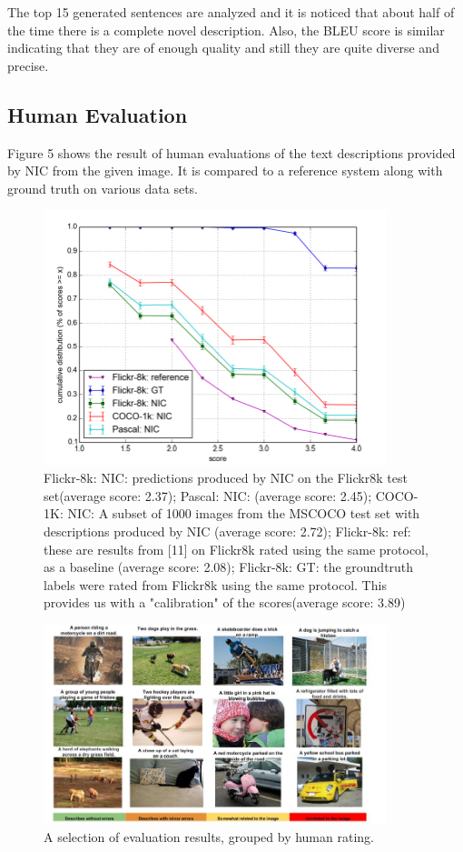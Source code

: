 \documentclass[a4paper,UKenglish,cleveref, autoref, thm-restate]{lipics-v2021}
\begin{document}
The top 15 generated sentences are analyzed and it is noticed that about half of the time there is a complete novel description. Also, the BLEU score is similar indicating that they are of enough quality and still they are quite diverse and precise.

\subsection{Human Evaluation}
Figure 5 shows the result of human evaluations of the text descriptions provided by NIC from the given image. It is compared to a reference system along with ground truth on various data sets.
\begin{figure}[ht]
    \centering
    \includegraphics[width=10cm]{images/NIC_Predictions.png}
    \caption{Flickr-8k: NIC: predictions produced by NIC on the Flickr8k test set(average score: 2.37); Pascal: NIC: (average score: 2.45); COCO-1K: NIC: A subset of 1000 images from the MSCOCO test set with descriptions produced by NIC (average score: 2.72); Flickr-8k: ref: these are results from [11] on Flickr8k rated using the same protocol, as a baseline (average score: 2.08); Flickr-8k: GT: the groundtruth labels were rated from Flickr8k using the same protocol. This provides us with a "calibration" of the scores(average score: 3.89)}
    \label{fig:}
\end{figure}

\begin{figure}[ht]
    \centering
    \includegraphics[width=10cm]{images/Human_Rating.png}
    \caption{A selection of evaluation results, grouped by human rating.}
    \label{fig:}
\end{figure}
\end{document}
